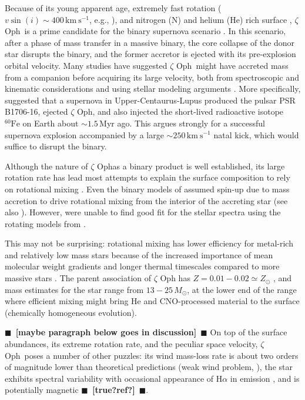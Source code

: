 \documentclass[twocolumn,twocolappendix,trackchanges]{aastex63}
\newcommand{\kms}{{\mathrm{km\ s^{-1}}}}
\newcommand{\zoph}{$\zeta$ Oph}
\newcommand{\todo}[1]{{\large $\blacksquare$~\textbf{\color{red}[#1]}}~$\blacksquare$}
\begin{document}
Because of its young apparent age, extremely fast rotation
($v\sin(i)\sim 400\,\kms$, e.g., \citealt{zehe:18}),
and nitrogen (N) and helium (He) rich surface \citep[e.g.,][]{blaauw:93,
  villamariz:05, marcolino:09}, \zoph\ is a prime
candidate for the binary supernova scenario \citep{blaauw:61,
  renzo:19walk}. In this scenario, after a phase of mass transfer in a
massive binary, the core collapse of the donor star disrupts the
binary, and the former accretor is ejected with its pre-explosion
orbital velocity. Many studies have suggested \zoph\
might have accreted mass from a companion before acquiring its large
velocity, both from spectroscopic and kinematic considerations
\citep[e.g.,][]{blaauw:93, hoogerwerf:00, hoogerwerf:01, tetzlaff:10, neuhauser:20}
and using stellar modeling arguments
\citep[e.g.,][]{vanrensbergen:96}.  More specifically,
\cite{neuhauser:20} suggested that a supernova in
Upper-Centaurus-Lupus produced the pulsar PSR B1706-16, ejected \zoph, and also injected the short-lived
radioactive isotope $^{60}\mathrm{Fe}$ on Earth about $\sim 1.5$\,Myr
ago. This argues strongly for a successful supernova explosion
accompanied by a large $\sim 250\,\kms$ natal kick,
which would suffice to disrupt the binary.

Although the nature of \zoph as a binary product is well
established, its large rotation rate has lead most attempts to explain
the surface composition to rely on rotational mixing
\cite[e.g.,][]{maeder:00}. Even the binary models of
\cite{vanrensbergen:96} assumed spin-up due to mass accretion
\citep[e.g.,][]{packet:81} to drive rotational mixing from the
interior of the accreting star (see also
\citealt{cantiello:07}). However, \cite{villamariz:05} were unable to
find good fit for the stellar spectra using the rotating models from
\cite{meynet:00}.

This may not be surprising: rotational mixing has
lower efficiency for metal-rich and relatively low mass stars because
of the increased importance of mean molecular weight gradients and
longer thermal timescales compared to more massive stars
\citep[e.g.,][]{yoon:06, perna:14}. The parent association of $\zeta$
Oph has $Z=0.01-0.02\simeq Z_\odot$ \citep[e.g.,][]{murphy:21}, and
mass estimates for the star range from $13-25\,M_\odot$, at the
lower end of the range where efficient mixing might bring He and
CNO-processed material to the surface (chemically homogeneous
evolution).

\todo{maybe paragraph below goes in discussion}
On top of the surface abundances, its extreme rotation rate, and the
peculiar space velocity, \zoph\ poses a number of other
puzzles: its wind mass-loss rate is about two orders of magnitude
lower than theoretical predictions (weak wind problem,
\citealt{marcolino:09}), the star exhibits spectral variability with
occasional appearance of H$\alpha$ in emission
\citep[e.g.,][]{walker:79}, and is potentially magnetic \todo{true?ref?}.
\end{document}
